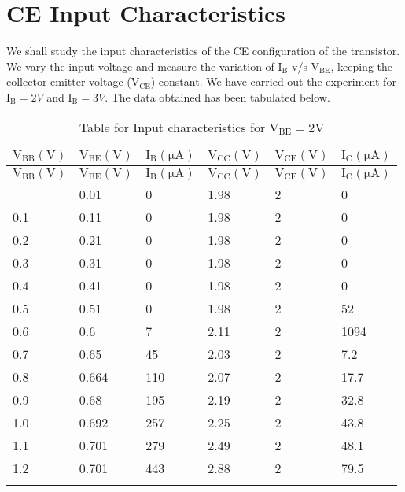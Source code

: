 \documentclass[12pt]{article}
\begin{document}
\section{CE Input Characteristics}
We shall study the input characteristics of the CE configuration of the transistor. We vary the input voltage and measure the variation of  $\mathrm{I_B}$ v/s $\mathrm{V_{BE}}$, keeping the collector-emitter voltage ($\mathrm{V_{CE}}$) constant. We have carried out the experiment for $\mathrm{I_B}=2 V$ and $\mathrm{I_B}=3 V$. The data obtained has been tabulated below.
\begin{longtable}{|l|l|l|l|l|l|}
	\hline
    $\mathrm{V_{BB}(V)}$ & $\mathrm{V_{BE}(V)}$ & $\mathrm{I_{B}(\mu A)}$  & $\mathrm{V_{CC}(V)}$  & $\mathrm{V_{CE}(V)}$ & $\mathrm{I_{C}(\mu A)}$  \\ \hline
	\endfirsthead
	\hline
   $\mathrm{V_{BB}(V)}$ & $\mathrm{V_{BE}(V)}$ & $\mathrm{I_{B}(\mu A)}$  & $\mathrm{V_{CC}(V)}$  & $\mathrm{V_{CE}(V)}$ & $\mathrm{I_{C}(\mu A)}$  \\ \hline
	\endhead
	\hline
	\endfoot
	
	\endlastfoot
    0.01 & 0.01  & 0   & 1.98  & 2  & 0   \\ \hline
    0.1  & 0.11  & 0   & 1.98  & 2  & 0   \\ \hline
    0.2  & 0.21  & 0   & 1.98  & 2  & 0   \\ \hline
    0.3  & 0.31  & 0   & 1.98  & 2  & 0   \\ \hline
    0.4  & 0.41  & 0   & 1.98  & 2  & 0   \\ \hline
    0.5  & 0.51  & 0   & 1.98  & 2  & 52  \\ \hline
    0.6  & 0.6   & 7   & 2.11  & 2  & 1094  \\ \hline
    0.7  & 0.65  & 45  & 2.03  & 2  & 7.2  \\ \hline
    0.8  & 0.664 & 110 & 2.07  & 2  & 17.7  \\ \hline
    0.9  & 0.68  & 195 & 2.19  & 2  & 32.8  \\ \hline
    1.0  & 0.692 & 257 & 2.25  & 2  & 43.8  \\ \hline
    1.1  & 0.701 & 279 & 2.49  & 2  & 48.1  \\ \hline
    1.2  & 0.701   & 443 & 2.88  & 2  & 79.5  \\ \hline
\caption{Table for Input characteristics for $\mathrm{V_{BE}=2V}$}
\end{longtable}
\end{document}
